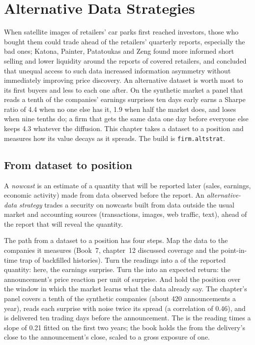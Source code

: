 \chapter{Alternative Data Strategies}\label{ch:s1:alternative-data-strategies}

When satellite images of retailers' car parks first reached investors, those who bought them could trade ahead of the retailers' quarterly reports,
especially the bad ones; Katona, Painter, Patatoukas and Zeng found more informed short selling and lower liquidity around the reports of covered retailers,
and concluded that unequal access to such data increased information asymmetry without immediately improving price discovery. An alternative dataset is
worth most to its first buyers and less to each one after. On the synthetic market a panel that reads a tenth of the companies' earnings surprises ten days
early earns a Sharpe ratio of 4.4 when no one else has it, 1.9 when half the market does, and loses when nine tenths do; a firm that gets the same data one
day before everyone else keeps 4.3 whatever the diffusion. This chapter takes a dataset to a position and measures how its value decays as it spreads. The
build is \texttt{firm.altstrat}.

\section{From dataset to position}

\begin{definition}\label{def:s1:alternative-data-strategies:nowcast}
A \emph{nowcast} is an estimate of a quantity that will be reported later (sales, earnings, economic activity) made from data observed
before the report. An \emph{alternative-data strategy} trades a security on nowcasts built from data outside the usual
market and accounting sources (transactions, images, web traffic, text), ahead of the report that will reveal the quantity.
\end{definition}

The path from a dataset to a position has four steps. Map the data to the companies it measures (Book~7, chapter~12 discussed coverage and the
point-in-time trap of backfilled histories). Turn the readings into a  of the reported quantity: here, the earnings surprise. Turn the  into
an expected return: the announcement's price reaction per unit of surprise. And hold the position over the window in which the market learns what the data
already say. The chapter's panel covers a tenth of the synthetic companies (about 420 announcements a year), reads each surprise with noise twice its spread (a
correlation of 0.46), and is delivered ten trading days before the announcement. The  is the reading times a slope of 0.21 fitted on the first two
years; the book holds the  from the delivery's close to the announcement's close, scaled to a gross exposure of one.

